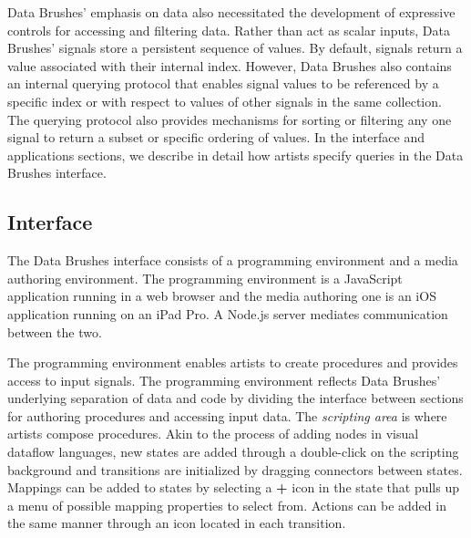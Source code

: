 \documentclass{sigchi}
\begin{document}
Data Brushes' emphasis on data also necessitated the development of expressive controls for accessing and filtering data. Rather than act as scalar inputs, Data Brushes' signals store a persistent sequence of values. By default, signals return a value associated with their internal index. However, Data Brushes also contains an internal querying protocol that enables signal values to be referenced by a specific index or with respect to values of other signals in the same collection. The querying protocol also provides mechanisms for sorting or filtering any one signal to return a subset or specific ordering of values. In the interface and applications sections, we describe in detail how artists specify queries in the Data Brushes interface. 

\subsection{Interface}
The Data Brushes interface consists of a programming environment and a media authoring environment. The programming environment is a JavaScript application running in a web browser and the media authoring one is an iOS application running on an iPad Pro. A Node.js server mediates communication between the two.

The programming environment enables artists to create procedures and provides access to input signals. The programming environment reflects Data Brushes' underlying separation of data and code by dividing the interface between sections for authoring procedures and accessing input data. The \textit{scripting area} is where artists compose procedures. Akin to the process of adding nodes in visual dataflow languages, new states are added through a double-click on the scripting background and transitions are initialized by dragging connectors between states.  Mappings can be added to states by selecting a \textbf{+} icon in the state that pulls up a menu of possible mapping properties to select from. Actions can be added in the same manner through an icon located in each transition. 
\end{document}
